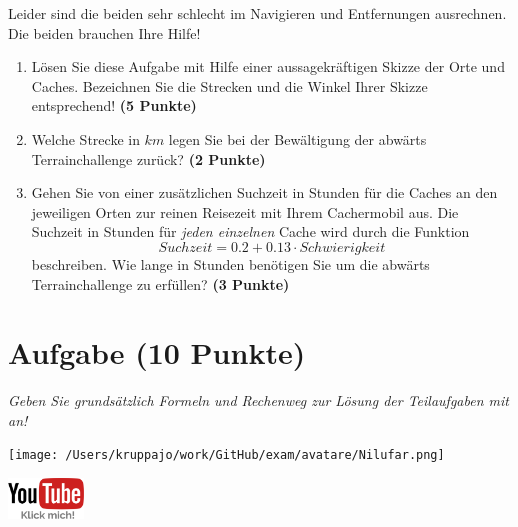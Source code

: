 \documentclass[a4paper, 9pt]{scrartcl}\usepackage[]{graphicx}\usepackage[]{xcolor}
\begin{document}
Leider sind die beiden sehr schlecht im Navigieren und Entfernungen ausrechnen. Die beiden brauchen Ihre Hilfe!
  
\begin{enumerate}
\item Lösen Sie diese Aufgabe mit Hilfe einer aussagekräftigen Skizze der Orte und Caches. Bezeichnen Sie die Strecken und die Winkel Ihrer Skizze entsprechend! \textbf{(5 Punkte)}
\item Welche Strecke in $km$ legen Sie bei der Bewältigung der abwärts Terrainchallenge zurück? \textbf{(2 Punkte)}
\item Gehen Sie von einer zusätzlichen Suchzeit in Stunden für die Caches an den jeweiligen Orten zur reinen Reisezeit mit Ihrem Cachermobil aus. Die Suchzeit in Stunden für \textit{jeden einzelnen} Cache wird durch die Funktion  
  \begin{equation*}
    Suchzeit = 0.2 + 0.13 \cdot Schwierigkeit
  \end{equation*}  
  beschreiben.  Wie lange in Stunden benötigen Sie um die abwärts Terrainchallenge zu erfüllen? \textbf{(3 Punkte)}
\end{enumerate}

 
\clearpage

\section{Aufgabe \hfill (10 Punkte)}

\textit{Geben Sie grundsätzlich Formeln und Rechenweg zur Lösung der Teilaufgaben mit an!} \\[1Ex]
 

 
\begin{minipage}[t]{0.5\textwidth}
\texttt{[image: /Users/kruppajo/work/GitHub/exam/avatare/Nilufar.png]}
\end{minipage}
\begin{minipage}[t]{0.5\textwidth}
\hfill
\href{https://youtu.be/4-dSaPMhK9s}{\includegraphics[width = 2cm]{img/youtube}}
\end{minipage}
\end{document}
